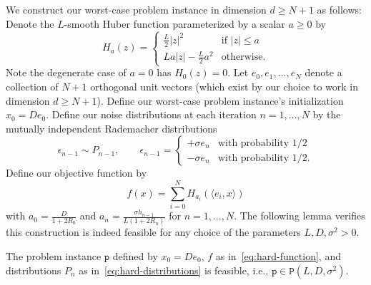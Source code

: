 \documentclass[11pt, hidelinks]{article}
\begin{document}
We construct our worst-case problem instance in dimension $d\geq N+1$ as follows:
Denote the $L$-smooth Huber function parameterized by a scalar $a\geq 0$ by
\begin{equation*}
    H_a(z) = \begin{cases}
        \frac{L}{2}|z|^2 & \text{if } |z|\leq a\\
        L a|z| - \frac{L}{2}a^2 & \text{otherwise}.
    \end{cases}
\end{equation*}
Note the degenerate case of $a=0$ has $H_0(z)=0$.
Let $e_0,e_1,\dots,e_N$ denote a collection of $N+1$ orthogonal unit vectors (which exist by our choice to work in dimension $d\geq N+1$). Define our worst-case problem instance's initialization $x_0 = De_0$.
Define our noise distributions at each iteration $n=1,\dots,N$ by the mutually independent Rademacher distributions
\begin{equation} \label{eq:hard-distributions}
   \epsilon_{n-1} \sim P_{n-1}, \qquad \epsilon_{n-1} = \begin{cases}
        + \sigma e_n & \text{with probability }1/2\\
        - \sigma e_n & \text{with probability }1/2.
    \end{cases}
\end{equation}
Define our objective function by
\begin{equation} \label{eq:hard-function}
    f(x) = \sum_{i=0}^N H_{a_i}(\langle e_i, x\rangle)
\end{equation}
with $a_0 = \frac{D}{1+2 R_0}$ and $a_n = \frac{\sigma h_{n-1}}{
L\left(1+2R_n\right)
}$ for $n=1,\dots,N$.
The following lemma verifies this construction is indeed feasible for any choice of the parameters $L,D,\sigma^2 >0$.
\begin{lemma}
    The problem instance $\mathtt{p}$ defined by $x_0=De_0$, $f$ as in~\eqref{eq:hard-function}, and distributions $P_n$ as in~\eqref{eq:hard-distributions} is feasible, i.e., $\mathtt{p}\in\mathtt{P}(L,D,\sigma^2)$.
\end{lemma}
\end{document}

